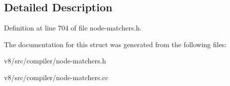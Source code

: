 \subsection{Detailed Description}


Definition at line 704 of file node-\/matchers.\+h.



The documentation for this struct was generated from the following files\+:\begin{DoxyCompactItemize}
\item 
v8/src/compiler/node-\/matchers.\+h\item 
v8/src/compiler/node-\/matchers.\+cc\end{DoxyCompactItemize}
